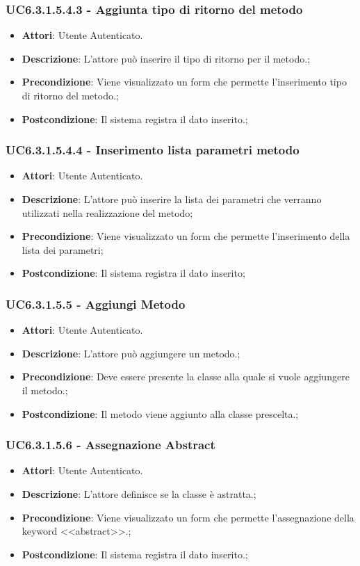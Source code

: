 \subsubsection{UC6.3.1.5.4.3 - Aggiunta tipo di ritorno del metodo} 
\label{sssec:UC6.3.1.5.4.3} 
\begin{itemize} 
\item \textbf{Attori}: Utente Autenticato.
\item \textbf{Descrizione}: L'attore può inserire il tipo di ritorno per il metodo.;
\item \textbf{Precondizione}: Viene visualizzato un form che permette l'inserimento tipo di ritorno del metodo.;
\item \textbf{Postcondizione}: Il sistema registra il dato inserito.;
\end{itemize} 
\subsubsection{UC6.3.1.5.4.4 - Inserimento lista parametri metodo} 
\label{sssec:UC6.3.1.5.4.4} 
\begin{itemize} 
\item \textbf{Attori}: Utente Autenticato.
\item \textbf{Descrizione}: L'attore può inserire la lista dei parametri che verranno utilizzati nella realizzazione del metodo;
\item \textbf{Precondizione}: Viene visualizzato un form che permette l'inserimento della lista dei parametri;
\item \textbf{Postcondizione}: Il sistema registra il dato inserito;
\end{itemize} 
\subsubsection{UC6.3.1.5.5 - Aggiungi Metodo} 
\label{sssec:UC6.3.1.5.5} 
\begin{itemize} 
\item \textbf{Attori}: Utente Autenticato.
\item \textbf{Descrizione}: L'attore può aggiungere un metodo.;
\item \textbf{Precondizione}: Deve essere presente la classe alla quale si vuole aggiungere il metodo.;
\item \textbf{Postcondizione}: Il metodo viene aggiunto alla classe prescelta.;
\end{itemize} 
\subsubsection{UC6.3.1.5.6 - Assegnazione Abstract} 
\label{sssec:UC6.3.1.5.6} 
\begin{itemize} 
\item \textbf{Attori}: Utente Autenticato.
\item \textbf{Descrizione}: L'attore definisce se la classe è astratta.;
\item \textbf{Precondizione}: Viene visualizzato un form che permette l'assegnazione della keyword <<abstract>>.;
\item \textbf{Postcondizione}: Il sistema registra il dato inserito.;
\end{itemize} 
